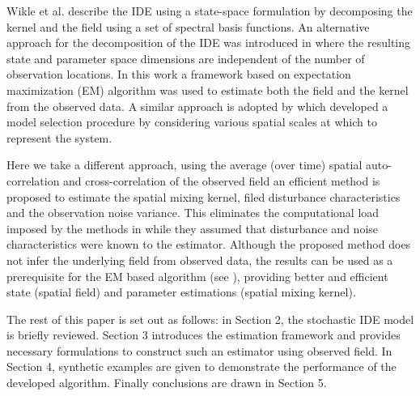 \documentclass[10pt,twocolumn,twoside]{IEEEtran}
\begin{document}
Wikle et al. \cite{Wikle2002} describe the IDE using a state-space formulation by decomposing the kernel and the field using a set of spectral basis functions. An alternative approach for the decomposition of the IDE was introduced in \cite{Dewar2009} where the resulting state and parameter space dimensions are independent of the number of observation locations. In this work a framework based on expectation maximization (EM)  algorithm \cite{Dempster1977,Gibsona2005}  was used to estimate both the field and the kernel from the observed data. A similar approach is adopted by \cite{Scerri2009} which developed a model selection procedure by considering various spatial scales at which to represent the system.  

Here we take a different approach, using the average (over time) spatial auto-correlation and cross-correlation  of the observed field an efficient method is proposed to estimate the spatial mixing kernel, filed disturbance characteristics and the observation noise variance. This eliminates the computational load imposed by the methods in \cite{Dewar2009,Scerri2009} while they assumed that disturbance and noise characteristics were known to the estimator. Although the proposed method does not infer the underlying field from observed data, the results can be used as a prerequisite for the EM based algorithm (see \cite{Dewar2009,Xu2007}), providing better and efficient state (spatial field) and parameter estimations (spatial mixing kernel). 

The rest of this paper is set out as follows: in Section 2, the stochastic IDE model is briefly reviewed. Section 3 introduces the estimation framework and provides necessary formulations  to construct such an estimator using observed field. In Section 4, synthetic examples are given to demonstrate the performance of the developed algorithm. Finally conclusions are drawn in Section 5.
\end{document}
